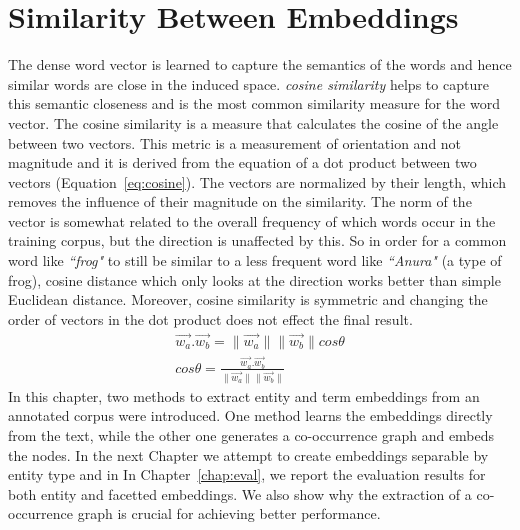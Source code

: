 \section{Similarity Between Embeddings }\label{sec:similarity}
The dense word vector is learned to capture the semantics of the words and hence similar words are close in the induced space. \emph{cosine similarity} helps to capture this semantic closeness and is the most common similarity measure for the word vector. The cosine similarity is a measure that calculates the cosine of the angle between two vectors. This metric is a measurement of orientation and not magnitude and it is derived from the equation of a dot product between two vectors (Equation~\ref{eq:cosine}). The vectors are normalized by their length, which removes the influence of their magnitude on the similarity. The norm of the vector is somewhat related to the overall frequency of which words occur in the training corpus, but the direction is unaffected by this. So in order for a common word like \emph{``frog"} to still be similar to a less frequent word like \emph{``Anura"} (a type of frog), cosine distance which only looks at the direction works better than simple Euclidean distance. Moreover, cosine similarity is symmetric and changing the order of vectors in the dot product does not effect the final result.
\begin{equation}
\begin{split}
\overrightarrow { w_a } .\overrightarrow { w_b } =\parallel \overrightarrow { w_a } \parallel \parallel \overrightarrow { w_b } \parallel cos\theta 
\\
cos\theta =\frac { \overrightarrow { w_a } .\overrightarrow { w_b }  }{ \parallel \overrightarrow { w_a } \parallel \parallel \overrightarrow { w_b } \parallel  } 
\end{split}
\label{eq:cosine}
\end{equation}
\noindent
In this chapter,  two methods to extract entity and term embeddings from an annotated corpus were introduced. One method learns the embeddings directly from the text, while the other one generates a co-occurrence graph and embeds the nodes. In the next Chapter we attempt to create embeddings separable by entity type and in In Chapter~\ref{chap:eval}, we report the evaluation results for both entity and facetted embeddings. We also show why the extraction of a co-occurrence graph is crucial for achieving better performance. 
